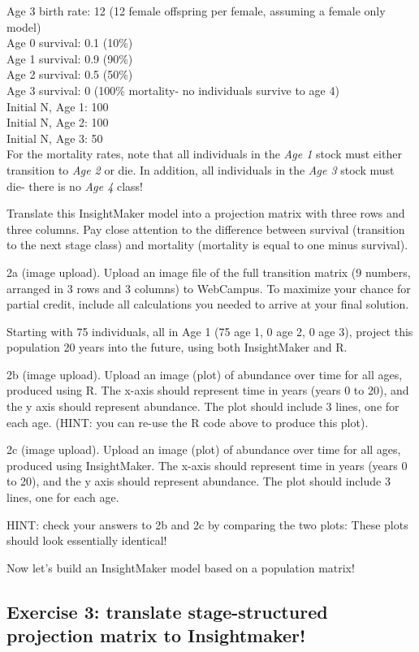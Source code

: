\documentclass[
]{article}
\begin{document}
Age 3 birth rate: 12 (12 female offspring per female, assuming a female
only model)\\
Age 0 survival: 0.1 (10\%)\\
Age 1 survival: 0.9 (90\%)\\
Age 2 survival: 0.5 (50\%)\\
Age 3 survival: 0 (100\% mortality- no individuals survive to age 4)\\
Initial N, Age 1: 100\\
Initial N, Age 2: 100\\
Initial N, Age 3: 50\\
For the mortality rates, note that all individuals in the \emph{Age 1}
stock must either transition to \emph{Age 2} or die. In addition, all
individuals in the \emph{Age 3} stock must die- there is no \emph{Age 4}
class!

Translate this InsightMaker model into a projection matrix with three
rows and three columns. Pay close attention to the difference between
survival (transition to the next stage class) and mortality (mortality
is equal to one minus survival).

2a (image upload). Upload an image file of the full transition matrix (9
numbers, arranged in 3 rows and 3 columns) to WebCampus. To maximize
your chance for partial credit, include all calculations you needed to
arrive at your final solution.

Starting with 75 individuals, all in Age 1 (75 age 1, 0 age 2, 0 age 3),
project this population 20 years into the future, using both
InsightMaker and R.

2b (image upload). Upload an image (plot) of abundance over time for all
ages, produced using R. The x-axis should represent time in years (years
0 to 20), and the y axis should represent abundance. The plot should
include 3 lines, one for each age. (HINT: you can re-use the R code
above to produce this plot).

2c (image upload). Upload an image (plot) of abundance over time for all
ages, produced using InsightMaker. The x-axis should represent time in
years (years 0 to 20), and the y axis should represent abundance. The
plot should include 3 lines, one for each age.

HINT: check your answers to 2b and 2c by comparing the two plots: These
plots should look essentially identical!

Now let's build an InsightMaker model based on a population matrix!

\hypertarget{exercise-3-translate-stage-structured-projection-matrix-to-insightmaker}{%
\subsection{Exercise 3: translate stage-structured projection matrix to
Insightmaker!}\label{exercise-3-translate-stage-structured-projection-matrix-to-insightmaker}}
\end{document}
